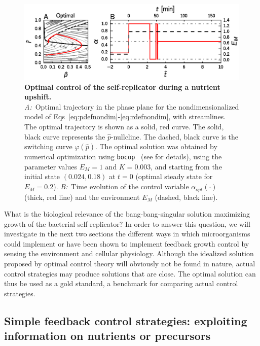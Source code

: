 \begin{figure}[ht]
\centering
\includegraphics[scale=1]{./Fig/Fig4.eps}
\caption[Optimal control of the self-replicator during a nutrient upshift]{
{\bf Optimal control of the self-replicator during a nutrient upshift.}\\
\textit{A:}~Optimal trajectory in the phase plane for the nondimensionalized model of Eqs~\ref{eq:pdefnondim}-\ref{eq:rdefnondim}, with streamlines. The optimal trajectory is shown as a solid, red curve.
The solid, black curve represents the $\hat{p}$-nullcline.
The dashed, black curve is the switching curve $\varphi(\hat{p})$.
The optimal solution was obtained by numerical optimization using \texttt{bocop}~\cite{bonnans_bocop_2012} (see  for details), using the parameter values $E_M=1$ and $K=0.003$, and starting from the initial state $(0.024,0.18)$ at $t=0$ (optimal steady state for $E_M=0.2$).
\textit{B:}~Time evolution of the control variable $\alpha_{opt}(\cdot)$ (thick, red line) and the environment $E_M$ (dashed, black line).
}
\label{fig:optimalcontrol}
\end{figure}

What is the biological relevance of the bang-bang-singular solution maximizing growth of the bacterial self-replicator?
In order to answer this question, we will investigate in the next two sections the different ways in which microorganisms could implement or have been shown to implement feedback growth control by sensing the environment and cellular physiology.
Although the idealized solution proposed by optimal control theory will obviously not be found in nature, actual control strategies may produce solutions that are close.
The optimal solution can thus be used as a gold standard, a benchmark for comparing actual control strategies. 

\subsection*{Simple feedback control strategies: exploiting information on nutrients or precursors}
\label{sec:steadystate}

